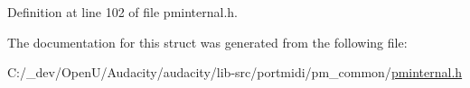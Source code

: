 Definition at line 102 of file pminternal.\+h.



The documentation for this struct was generated from the following file\+:\begin{DoxyCompactItemize}
\item 
C\+:/\+\_\+dev/\+Open\+U/\+Audacity/audacity/lib-\/src/portmidi/pm\+\_\+common/\hyperlink{pminternal_8h}{pminternal.\+h}\end{DoxyCompactItemize}
